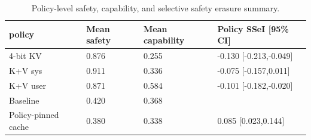 \begin{table}[t]
\centering
\begingroup
\small
\setlength{\tabcolsep}{3pt}
\renewcommand{\arraystretch}{0.94}
\begin{tabularx}{\linewidth}{@{}lXXX@{}}
\toprule
policy & Mean safety & Mean capability & Policy SSeI [95\% CI] \\
\midrule
4-bit KV & 0.876 & 0.255 & -0.130 [-0.213,-0.049] \\
K+V sys & 0.911 & 0.336 & -0.075 [-0.157,0.011] \\
K+V user & 0.871 & 0.584 & -0.101 [-0.182,-0.020] \\
Baseline & 0.420 & 0.368 &  \\
Policy-pinned cache & 0.380 & 0.338 & 0.085 [0.023,0.144] \\
\bottomrule
\end{tabularx}
\endgroup
\caption{Policy-level safety, capability, and selective safety erasure summary.}
\label{tab:main-results}
\end{table}
